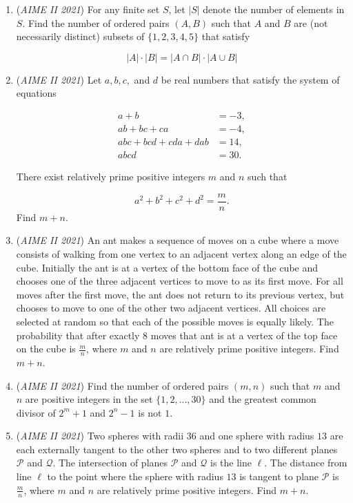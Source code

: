 \begin{enumerate}
 

	\item (\textit{AIME II 2021}) For any finite set $S$, let $|S|$ denote the number of elements in $S$. Find the number of ordered pairs $(A,B)$ such that $A$ and $B$ are (not necessarily distinct) subsets of $\{1,2,3,4,5\}$ that satisfy

 \[|A| \cdot |B| = |A \cap B| \cdot |A \cup B|\]


	\item (\textit{AIME II 2021}) Let $a, b, c,$ and $d$ be real numbers that satisfy the system of equations

 \begin{align*} a + b &= -3, \\ ab + bc + ca &= -4, \\ abc + bcd + cda + dab &= 14, \\ abcd &= 30. \end{align*}

There exist relatively prime positive integers $m$ and $n$ such that

 \[a^2 + b^2 + c^2 + d^2 = \frac{m}{n}.\]Find $m + n$.


 

	\item (\textit{AIME II 2021}) An ant makes a sequence of moves on a cube where a move consists of walking from one vertex to an adjacent vertex along an edge of the cube. Initially the ant is at a vertex of the bottom face of the cube and chooses one of the three adjacent vertices to move to as its first move. For all moves after the first move, the ant does not return to its previous vertex, but chooses to move to one of the other two adjacent vertices. All choices are selected at random so that each of the possible moves is equally likely. The probability that after exactly $8$ moves that ant is at a vertex of the top face on the cube is $\frac{m}{n}$, where $m$ and $n$ are relatively prime positive integers. Find $m + n.$


	\item (\textit{AIME II 2021}) Find the number of ordered pairs $(m, n)$ such that $m$ and $n$ are positive integers in the set $\{1, 2, ..., 30\}$ and the greatest common divisor of $2^m + 1$ and $2^n - 1$ is not $1$.


 

	\item (\textit{AIME II 2021}) Two spheres with radii $36$ and one sphere with radius $13$ are each externally tangent to the other two spheres and to two different planes $\mathcal{P}$ and $\mathcal{Q}$. The intersection of planes $\mathcal{P}$ and $\mathcal{Q}$ is the line $\ell$. The distance from line $\ell$ to the point where the sphere with radius $13$ is tangent to plane $\mathcal{P}$ is $\frac{m}{n}$, where $m$ and $n$ are relatively prime positive integers. Find $m + n$.



\end{enumerate}
